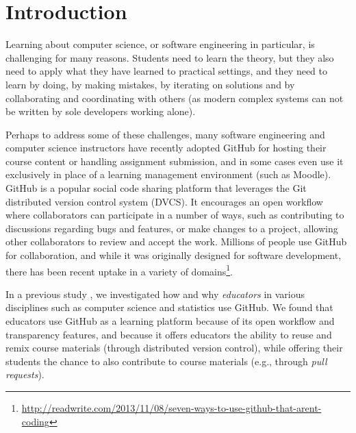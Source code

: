 \section{Introduction}


Learning about computer science, or software engineering in particular, is challenging for many reasons. Students need to learn the theory, but they also need to apply what they have learned to practical settings, and they need to learn by doing, by making mistakes, by iterating on solutions and by collaborating and coordinating with others (as modern complex systems can not be written by sole developers working alone).

Perhaps to address some of these challenges, many software engineering and computer science instructors have recently adopted GitHub for hosting their course content or handling assignment submission, and in some cases even use it exclusively in place of a learning management environment (such as Moodle).
%
GitHub is a popular social code sharing platform that leverages the Git distributed version control system (DVCS). It encourages an open workflow where collaborators can participate in a number of ways, such as contributing to discussions regarding bugs and features, or make changes to a project, allowing other collaborators to review and accept the work. Millions of people use GitHub for collaboration, and while it was originally designed for software development, there has been recent uptake in a variety of domains\footnote{\url{http://readwrite.com/2013/11/08/seven-ways-to-use-github-that-arent-coding}}.

 In a previous study \cite{zagalsky2015emergence}, we investigated how and why \emph{educators} in various disciplines such as computer science and statistics use GitHub. We found that educators use GitHub as a learning platform because of its open workflow and transparency features, and because it offers educators the ability to reuse and remix course materials (through distributed version control), while offering their students the chance to also contribute to course materials (e.g., through \emph{pull requests}).

